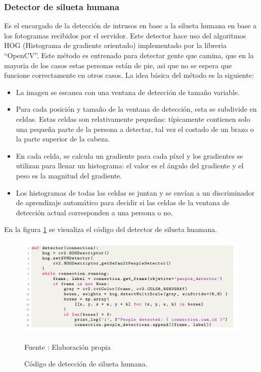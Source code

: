 \subsubsection{Detector de silueta humana}
Es el encargado de la detección de intrusos en base a la silueta humana en base a los fotogramas recibidos por el servidor. Este detector hace uso del algoritmos HOG (Histograma de gradiente orientado) implementado por la libreria ``OpenCV''. Este método es entrenado para detectar gente que camina, que en la mayoria de los casos estas personas están de pie, asi que no se espera que funcione correctamente en otros casos.
La idea básica del método es la siguiente:
\begin{itemize}
    \item La imagen se escanea con una ventana de detección de tamaño variable.
    \item Para cada posición y tamaño de la ventana de detección, esta se subdivide en celdas. Estas celdas son relativamente pequeñas: típicamente contienen solo una pequeña parte de la persona a detectar, tal vez el costado de un brazo o la parte superior de la cabeza.
    \item En cada celda, se calcula un gradiente para cada píxel y los gradientes se utilizan para llenar un histograma: el valor es el ángulo del gradiente y el peso es la magnitud del gradiente.
    \item Los histogramas de todas las celdas se juntan y se envían a un discriminador de aprendizaje automático para decidir si las celdas de la ventana de detección actual corresponden a una persona o no.
\end{itemize}

En la figura \ref{fig:human_detector} se visualiza el código del detector de silueta huamana.
\begin{figure}[H]
    \begin{center}
        \includegraphics[width=16cm]{img/capitulo_5/human_detector.png}
    \end{center}
    \begin{center}
        \caption{Código de detección de silueta humana.}
        Fuente : Elaboración propia
        \label{fig:human_detector}
    \end{center}
\end{figure}

